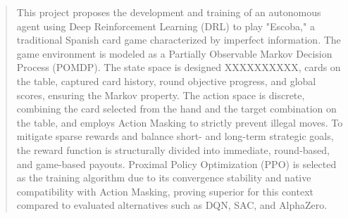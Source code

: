 \begin{abstractpage}

\begin{abstract}
    This project proposes the development and training of an autonomous agent using Deep Reinforcement Learning (DRL) to play "Escoba," a traditional Spanish card game characterized by imperfect information. The game environment is modeled as a Partially Observable Markov Decision Process (POMDP). The state space is designed XXXXXXXXXX, cards on the table, captured card history, round objective progress, and global scores, ensuring the Markov property. The action space is discrete, combining the card selected from the hand and the target combination on the table, and employs Action Masking to strictly prevent illegal moves. To mitigate sparse rewards and balance short- and long-term strategic goals, the reward function is structurally divided into immediate, round-based, and game-based payouts. Proximal Policy Optimization (PPO) is selected as the training algorithm due to its convergence stability and native compatibility with Action Masking, proving superior for this context compared to evaluated alternatives such as DQN, SAC, and AlphaZero.
\end{abstract}

\end{abstractpage}